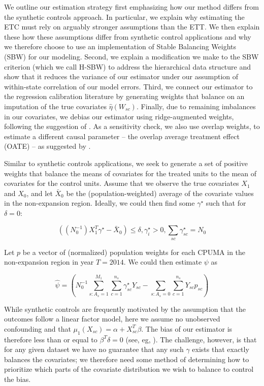 \documentclass[12pt]{article}
\begin{document}
We outline our estimation strategy first emphasizing how our method differs from the synthetic controls approach. In particular, we explain why estimating the ETC must rely on arguably stronger assumptions than the ETT. We then explain these how these assumptions differ from synthetic control applications and why we therefore choose to use an implementation of Stable Balancing Weights (SBW) for our modeling. Second, we explain a modification we make to the SBW criterion (which we call H-SBW) to address the hierarchical data structure and show that it reduces the variance of our estimator under our assumption of within-state correlation of our model errors. Third, we connect our estimator to the regression calibration literature by generating weights that balance on an imputation of the true covariates $\hat{\eta}(W_{sc})$. Finally, due to remaining imbalances in our covariates, we debias our estimator using ridge-augmented weights, following the suggestion of \cite{ben2018augmented}. As a sensitivity check, we also use overlap weights, to estimate a different causal parameter -- the overlap average treatment effect (OATE) -- as suggested by \cite{li2018balancing}.

Similar to synthetic controls applications, we seek to generate a set of positive weights that balance the means of covariates for the treated units to the mean of covariates for the control units. Assume that we observe the true covariates $X_1$ and $X_0$, and let $\bar{X}_0$ be the (population-weighted) average of the covariate values in the non-expansion region. Ideally, we could then find some $\gamma^\star$ such that for $\delta = 0$: 

$$
((N_0^{-1})X_1^T\gamma^\star - \bar{X}_0) \le \delta, \gamma_i^\star > 0, \sum_{sc} \gamma_{sc}^\star = N_0
$$

Let $p$ be a vector of (normalized) population weights for each CPUMA in the non-expansion region in year $T = 2014$. We could then estimate $\psi$ as

$$
\hat{\psi} = (N_0^{-1}\sum_{s: A_s = 1}^{M_1}\sum_{c = 1}^{n_s}\gamma_{sc}^\star Y_{sc} - \sum_{s: A_s = 0}\sum_{c = 1}^{n_s}Y_{sc}p_{sc})
$$

While synthetic controls are frequently motivated by the assumption that the outcomes follow a linear factor model, here we assume no unobserved confounding and that $\mu_1(X_{sc}) = \alpha + X_{sc}^T\beta$. The bias of our estimator is therefore less than or equal to $\beta^T \delta = 0$ (see, eg, \cite{zubizarreta2015stable}). The challenge, however, is that for any given dataset we have no guarantee that any such $\gamma$ exists that exactly balances the covariates; we therefore need some method of determining how to prioritize which parts of the covariate distribution we wish to balance to control the bias.
\end{document}
